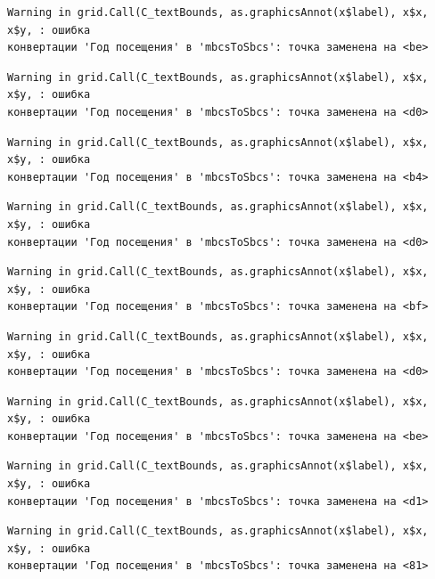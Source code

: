 \documentclass[
  letterpaper,
  DIV=11,
  numbers=noendperiod]{scrreprt}
\begin{document}
\begin{verbatim}
Warning in grid.Call(C_textBounds, as.graphicsAnnot(x$label), x$x, x$y, : ошибка
конвертации 'Год посещения' в 'mbcsToSbcs': точка заменена на <be>
\end{verbatim}

\begin{verbatim}
Warning in grid.Call(C_textBounds, as.graphicsAnnot(x$label), x$x, x$y, : ошибка
конвертации 'Год посещения' в 'mbcsToSbcs': точка заменена на <d0>
\end{verbatim}

\begin{verbatim}
Warning in grid.Call(C_textBounds, as.graphicsAnnot(x$label), x$x, x$y, : ошибка
конвертации 'Год посещения' в 'mbcsToSbcs': точка заменена на <b4>
\end{verbatim}

\begin{verbatim}
Warning in grid.Call(C_textBounds, as.graphicsAnnot(x$label), x$x, x$y, : ошибка
конвертации 'Год посещения' в 'mbcsToSbcs': точка заменена на <d0>
\end{verbatim}

\begin{verbatim}
Warning in grid.Call(C_textBounds, as.graphicsAnnot(x$label), x$x, x$y, : ошибка
конвертации 'Год посещения' в 'mbcsToSbcs': точка заменена на <bf>
\end{verbatim}

\begin{verbatim}
Warning in grid.Call(C_textBounds, as.graphicsAnnot(x$label), x$x, x$y, : ошибка
конвертации 'Год посещения' в 'mbcsToSbcs': точка заменена на <d0>
\end{verbatim}

\begin{verbatim}
Warning in grid.Call(C_textBounds, as.graphicsAnnot(x$label), x$x, x$y, : ошибка
конвертации 'Год посещения' в 'mbcsToSbcs': точка заменена на <be>
\end{verbatim}

\begin{verbatim}
Warning in grid.Call(C_textBounds, as.graphicsAnnot(x$label), x$x, x$y, : ошибка
конвертации 'Год посещения' в 'mbcsToSbcs': точка заменена на <d1>
\end{verbatim}

\begin{verbatim}
Warning in grid.Call(C_textBounds, as.graphicsAnnot(x$label), x$x, x$y, : ошибка
конвертации 'Год посещения' в 'mbcsToSbcs': точка заменена на <81>
\end{verbatim}
\end{document}
